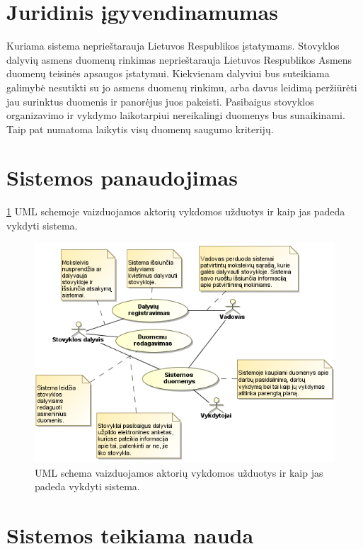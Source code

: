 \section{Juridinis įgyvendinamumas}

Kuriama sistema neprieštarauja Lietuvos Respublikos įstatymams. Stovyklos 
dalyvių asmens duomenų rinkimas neprieštarauja Lietuvos Respublikos 
Asmens duomenų teisinės apsaugos įstatymui. Kiekvienam dalyviui bus 
suteikiama galimybė nesutikti su jo asmens duomenų rinkimu, arba davus 
leidimą peržiūrėti jau surinktus duomenis ir panorėjus juos pakeisti. 
Pasibaigus stovyklos organizavimo ir vykdymo laikotarpiui nereikalingi 
duomenys bus sunaikinami. Taip pat numatoma laikytis visų duomenų saugumo 
kriterijų.

\section{Sistemos panaudojimas}

\ref{fig:uml_tasks} UML schemoje vaizduojamos aktorių vykdomos užduotys ir 
kaip jas padeda vykdyti sistema.

\begin{figure}[htb]
  \begin{center}
    \includegraphics[scale=0.8]{images/sistemos_panaudojimas.png}
  \end{center}
  \caption{UML schema vaizduojamos aktorių vykdomos užduotys ir kaip jas
    padeda vykdyti sistema.}
  \label{fig:uml_tasks}
\end{figure}

\section{Sistemos teikiama nauda}

